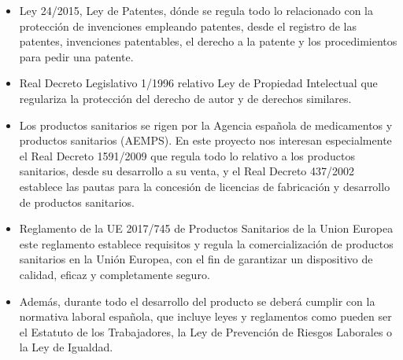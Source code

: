 \begin{itemize}
    \item Ley 24/2015\cite{patentes}, Ley de Patentes, dónde se regula todo lo relacionado con la protección de invenciones empleando patentes, desde el registro de las patentes, invenciones patentables, el derecho a la patente y los procedimientos para pedir una patente.
    
    \item Real Decreto Legislativo 1/1996\cite{PropIntelectual} relativo Ley de Propiedad Intelectual que regulariza la protección del derecho de autor y de derechos similares.
    
    \item Los productos sanitarios se rigen por la Agencia española de medicamentos y productos sanitarios (AEMPS)\cite{AEMPS}. En este proyecto nos interesan especialmente el Real Decreto 1591/2009\cite{prodSanitario1} que regula todo lo relativo a los productos sanitarios, desde su desarrollo a su venta, y el Real Decreto 437/2002\cite{prodSanitario2} establece las pautas para la concesión de licencias de fabricación y desarrollo de productos sanitarios.
    
    \item Reglamento de la UE 2017/745\cite{ProdSanitariosEU} de Productos Sanitarios de la Union Europea este reglamento establece requisitos y regula la comercialización de productos sanitarios en la Unión Europea, con el fin de garantizar un dispositivo de calidad, eficaz y completamente seguro.
    
    \item Además, durante todo el desarrollo del producto se deberá cumplir con la normativa laboral española\cite{normaLaboral}, que incluye leyes y reglamentos como pueden ser el Estatuto de los Trabajadores, la Ley de Prevención de Riesgos Laborales o la Ley de Igualdad.
    
\end{itemize}


